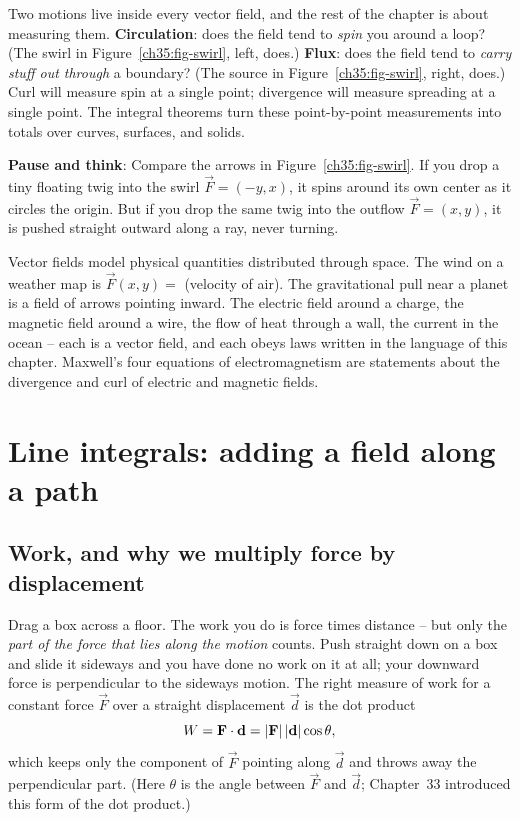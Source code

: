 \begin{intuitionbox}
Two motions live inside every vector field, and the rest of the chapter is about
measuring them. \textbf{Circulation}: does the field tend to \emph{spin} you
around a loop? (The swirl in Figure~\ref{ch35:fig-swirl}, left, does.) \textbf{Flux}:
does the field tend to \emph{carry stuff out through} a boundary? (The source in
Figure~\ref{ch35:fig-swirl}, right, does.) Curl will measure spin at a single
point; divergence will measure spreading at a single point. The integral theorems
turn these point-by-point measurements into totals over curves, surfaces, and
solids.
\end{intuitionbox}

\begin{recoverybox}
\textbf{Pause and think}: Compare the arrows in Figure~\ref{ch35:fig-swirl}.
If you drop a tiny floating twig into the swirl $\vec F = (-y, x)$, it spins around
its own center as it circles the origin. But if you drop the same twig into
the outflow $\vec F = (x, y)$, it is pushed straight outward along a ray,
never turning.
\end{recoverybox}

\begin{applicationbox}
Vector fields model physical quantities distributed through space. The wind on a
weather map is $\vec F(x,y)=$ (velocity of air). The gravitational pull near a
planet is a field of arrows pointing inward. The electric field around a charge,
the magnetic field around a wire, the flow of heat through a wall, the current in
the ocean -- each is a vector field, and each obeys laws written in the language
of this chapter. Maxwell's four equations of electromagnetism are statements
about the divergence and curl of electric and magnetic fields.
\end{applicationbox}

\section{Line integrals: adding a field along a path}
\label{ch35:lineint}

\subsection{Work, and why we multiply force by displacement}

Drag a box across a floor. The work you do is force times distance -- but only the
\emph{part of the force that lies along the motion} counts. Push straight down on
a box and slide it sideways and you have done no work on it at all; your downward
force is perpendicular to the sideways motion. The right measure of work for a
constant force $\vec F$ over a straight displacement $\vec d$ is the dot product
\[
  W = \mathbf{F} \cdot \mathbf{d} = \lvert\mathbf{F}\rvert\,\lvert\mathbf{d}\rvert\cos\theta,
\]
which keeps only the component of $\vec F$ pointing along $\vec d$ and throws
away the perpendicular part. (Here $\theta$ is the angle between $\vec F$ and
$\vec d$; Chapter~33 introduced this form of the dot product.)

